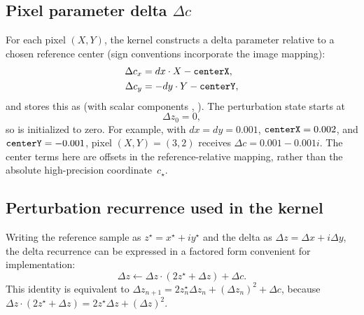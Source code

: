 \subsection{Pixel parameter delta \texorpdfstring{$\Delta c$}{Delta c}}
\label{sec:perturb-only-deltac}

For each pixel \((X,Y)\), the kernel constructs a delta parameter relative to a
chosen reference center (sign conventions incorporate the image mapping):
\begin{align}
\Delta c_x &= dx \cdot X - \texttt{centerX}, \\
\Delta c_y &= -dy \cdot Y - \texttt{centerY},
\end{align}
and stores this as  (with scalar components ,
). The perturbation state starts at
\[
\Delta z_0 = 0,
\]
so  is initialized to zero. For example, with
$dx=dy=0.001$, $\texttt{centerX}=0.002$, and $\texttt{centerY}=-0.001$, pixel
$(X,Y)=(3,2)$ receives $\Delta c=0.001-0.001i$. The center terms here are
offsets in the reference-relative mapping, rather than the absolute
high-precision coordinate~$c_\star$.

\subsection{Perturbation recurrence used in the kernel}
\label{sec:perturb-only-update}

Writing the reference sample as \(z^\star = x^\star + i y^\star\) and the delta
as \(\Delta z = \Delta x + i \Delta y\), the delta recurrence can be expressed
in a factored form convenient for implementation:
\begin{equation}
\Delta z \leftarrow \Delta z \cdot (2 z^\star + \Delta z) + \Delta c.
\label{eq:perturb-factor}
\end{equation}
This identity is equivalent to
\(\Delta z_{n+1} = 2 z_n^\star \Delta z_n + (\Delta z_n)^2 + \Delta c\), because
\(\Delta z\cdot(2z^\star+\Delta z) = 2z^\star\Delta z + (\Delta z)^2\).

